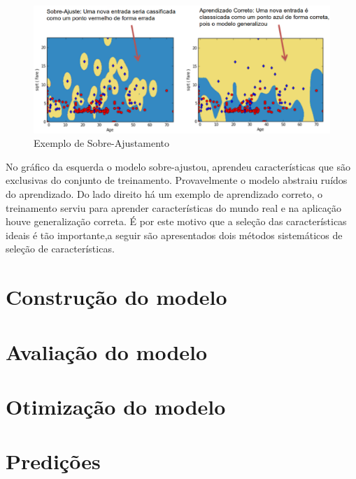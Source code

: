 \begin{figure}[!h]
\centering
\includegraphics[keepaspectratio=true,scale=0.40]
{figuras/overfitting.eps}
\caption{Exemplo de Sobre-Ajustamento}
\label{over}
\end{figure}

No gráfico da esquerda o modelo sobre-ajustou, aprendeu características que são exclusivas do conjunto de treinamento. Provavelmente o modelo abstraiu ruídos do aprendizado. Do lado direito há um exemplo de aprendizado correto, o treinamento serviu para aprender características do mundo real e na aplicação houve generalização correta. É por este motivo que a seleção das características ideais é tão importante,a seguir são apresentados dois métodos sistemáticos de seleção de características.








\section{Construção do modelo}
\section{Avaliação do modelo}
\section{Otimização do modelo}
\section{Predições}


